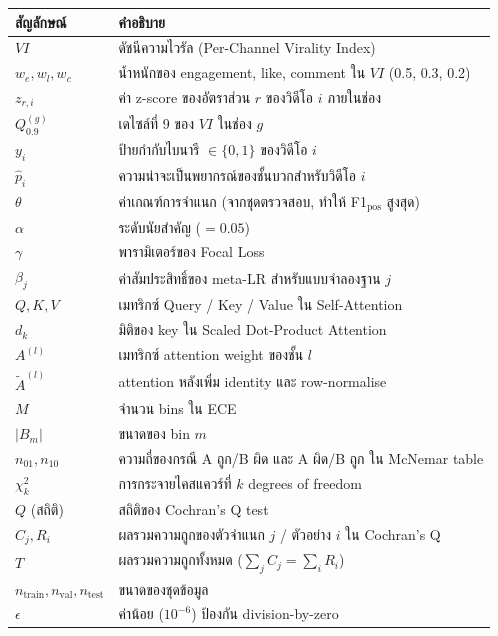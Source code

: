 \begin{longtable}{p{3cm}p{10.5cm}}
\toprule
\textbf{สัญลักษณ์} & \textbf{คำอธิบาย} \\
\midrule
\endhead
$\mathit{VI}$              & ดัชนีความไวรัล (Per-Channel Virality Index) \\
$w_e, w_l, w_c$            & น้ำหนักของ engagement, like, comment ใน $\mathit{VI}$ (0.5, 0.3, 0.2) \\
$z_{r,i}$                  & ค่า z-score ของอัตราส่วน $r$ ของวิดีโอ $i$ ภายในช่อง \\
$Q_{0.9}^{(g)}$            & เดไซล์ที่ 9 ของ $\mathit{VI}$ ในช่อง $g$ \\
$y_i$                      & ป้ายกำกับไบนารี $\in \{0,1\}$ ของวิดีโอ $i$ \\
$\hat p_i$                 & ความน่าจะเป็นพยากรณ์ของชั้นบวกสำหรับวิดีโอ $i$ \\
$\theta$                   & ค่าเกณฑ์การจำแนก (จากชุดตรวจสอบ, ทำให้ F1$_{\text{pos}}$ สูงสุด) \\
$\alpha$                   & ระดับนัยสำคัญ ($=0.05$) \\
$\gamma$                   & พารามิเตอร์ของ Focal Loss \\
$\beta_j$                  & ค่าสัมประสิทธิ์ของ meta-LR สำหรับแบบจำลองฐาน $j$ \\
$Q, K, V$                  & เมทริกซ์ Query / Key / Value ใน Self-Attention \\
$d_k$                      & มิติของ key ใน Scaled Dot-Product Attention \\
$A^{(l)}$                  & เมทริกซ์ attention weight ของชั้น $l$ \\
$\tilde A^{(l)}$           & attention หลังเพิ่ม identity และ row-normalise \\
$M$                        & จำนวน bins ใน ECE \\
$|B_m|$                    & ขนาดของ bin $m$ \\
$n_{01}, n_{10}$           & ความถี่ของกรณี A ถูก/B ผิด และ A ผิด/B ถูก ใน McNemar table \\
$\chi^2_{k}$               & การกระจายไคสแควร์ที่ $k$ degrees of freedom \\
$Q$ (สถิติ)                & สถิติของ Cochran's Q test \\
$C_j, R_i$                 & ผลรวมความถูกของตัวจำแนก $j$ / ตัวอย่าง $i$ ใน Cochran's Q \\
$T$                        & ผลรวมความถูกทั้งหมด ($\sum_j C_j = \sum_i R_i$) \\
$n_{\text{train}}, n_{\text{val}}, n_{\text{test}}$ & ขนาดของชุดข้อมูล \\
$\epsilon$                 & ค่าน้อย ($10^{-6}$) ป้องกัน division-by-zero \\
\bottomrule
\end{longtable}
\newpage

